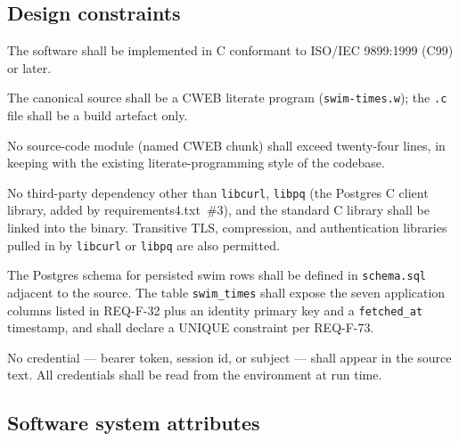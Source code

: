 \documentclass[12pt]{article}
\newcommand{\code}[1]{\texttt{#1}}
\newcommand{\req}[1]{\textbf{[#1]}}
\begin{document}
\subsection{Design constraints}

\begin{description}[style=nextline]
  \item[\req{REQ-D-01}] The software shall be implemented in C
        conformant to ISO/IEC 9899:1999 (C99) or later.
  \item[\req{REQ-D-02}] The canonical source shall be a CWEB
        literate program (\code{swim-times.w}); the
        \code{.c} file shall be a build artefact only.
  \item[\req{REQ-D-03}] No source-code module (named CWEB chunk)
        shall exceed twenty-four lines, in keeping with the
        existing literate-programming style of the codebase.
  \item[\req{REQ-D-04}] No third-party dependency other than
        \code{libcurl}, \code{libpq} (the Postgres C client
        library, added by requirements4.txt~\#3), and the standard
        C library shall be linked into the binary.  Transitive
        TLS, compression, and authentication libraries pulled in
        by \code{libcurl} or \code{libpq} are also permitted.
  \item[\req{REQ-D-10}] The Postgres schema for persisted swim
        rows shall be defined in \texttt{schema.sql} adjacent to
        the source.  The table \texttt{swim\_times} shall expose
        the seven application columns listed in REQ-F-32 plus an
        identity primary key and a \texttt{fetched\_at} timestamp,
        and shall declare a UNIQUE constraint per REQ-F-73.
  \item[\req{REQ-D-11}] No credential --- bearer token, session id, or
        subject --- shall appear in the source text.  All credentials
        shall be read from the environment at run time.
\end{description}

\subsection{Software system attributes}
\end{document}
